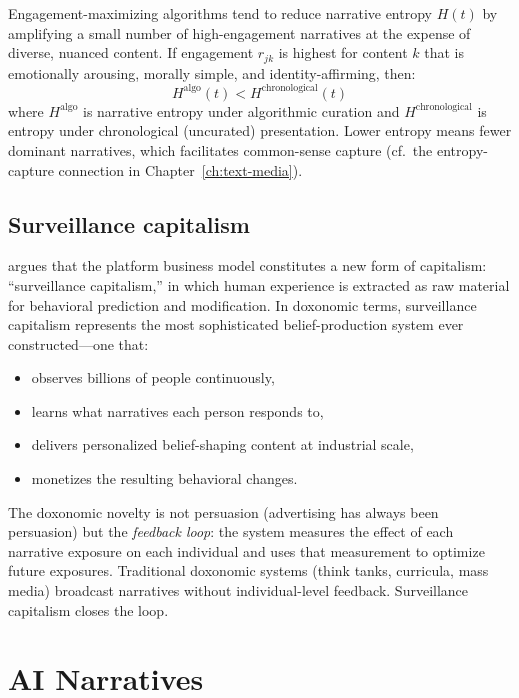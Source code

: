 \begin{proposition}
\label{prop:algo-entropy}
Engagement-maximizing algorithms tend to reduce narrative entropy $H(t)$ by amplifying a small number of high-engagement narratives at the expense of diverse, nuanced content.
If engagement $r_{jk}$ is highest for content $k$ that is emotionally arousing, morally simple, and identity-affirming, then:
\[
  H^{\text{algo}}(t) < H^{\text{chronological}}(t)
\]
where $H^{\text{algo}}$ is narrative entropy under algorithmic curation and $H^{\text{chronological}}$ is entropy under chronological (uncurated) presentation.
Lower entropy means fewer dominant narratives, which facilitates common-sense capture (cf.\ the entropy-capture connection in Chapter~\ref{ch:text-media}).
\end{proposition}

\subsection{Surveillance capitalism}

\textcite{zuboff2019} argues that the platform business model constitutes a new form of capitalism: ``surveillance capitalism,'' in which human experience is extracted as raw material for behavioral prediction and modification.
In doxonomic terms, surveillance capitalism represents the most sophisticated belief-production system ever constructed---one that:
\begin{itemize}[nosep]
  \item observes billions of people continuously,
  \item learns what narratives each person responds to,
  \item delivers personalized belief-shaping content at industrial scale,
  \item monetizes the resulting behavioral changes.
\end{itemize}

The doxonomic novelty is not persuasion (advertising has always been persuasion) but the \emph{feedback loop}: the system measures the effect of each narrative exposure on each individual and uses that measurement to optimize future exposures.
Traditional doxonomic systems (think tanks, curricula, mass media) broadcast narratives without individual-level feedback.
Surveillance capitalism closes the loop.

\section{AI Narratives}
\label{sec:ch28-ai}

